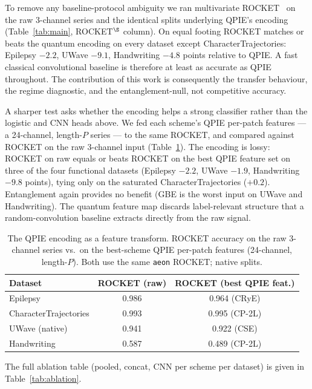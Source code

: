 \documentclass[conference,compsoc]{IEEEtran}
\begin{document}
To remove any baseline-protocol ambiguity we ran multivariate
ROCKET~\cite{dempster2020rocket} on the raw 3-channel series and the
identical splits underlying QPIE's encoding (Table~\ref{tab:main},
ROCKET$^\S$ column). On equal footing ROCKET matches or beats the quantum encoding
on every dataset except CharacterTrajectories: Epilepsy $-2.2$, UWave
$-9.1$, Handwriting $-4.8$ points relative to QPIE. A fast classical
convolutional baseline is therefore at least as accurate as QPIE
throughout. The contribution of this work is consequently the transfer
behaviour, the regime diagnostic, and the entanglement-null, not
competitive accuracy.

A sharper test asks whether the encoding helps a strong classifier
rather than the logistic and CNN heads above. We fed each scheme's
QPIE per-patch features --- a 24-channel, length-$P$ series --- to the
same ROCKET, and compared against ROCKET on the raw 3-channel input
(Table~\ref{tab:rocketqpie}). The encoding is lossy: ROCKET on raw
equals or beats ROCKET on the best QPIE feature set on three of the
four functional datasets (Epilepsy $-2.2$, UWave $-1.9$, Handwriting
$-9.8$ points), tying only on the saturated CharacterTrajectories
($+0.2$). Entanglement again provides no benefit (GBE is the worst
input on UWave and Handwriting). The quantum feature map discards
label-relevant structure that a random-convolution baseline extracts
directly from the raw signal.

\begin{table}[t]
\caption{The QPIE encoding as a feature transform. ROCKET accuracy on
the raw 3-channel series vs.\ on the best-scheme QPIE per-patch
features (24-channel, length-$P$). Both use the same \texttt{aeon}
ROCKET; native splits.}
\label{tab:rocketqpie}
\centering
\setlength{\tabcolsep}{6pt}
\begin{tabular}{lcc}
\toprule
Dataset & ROCKET (raw) & ROCKET (best QPIE feat.) \\
\midrule
Epilepsy              & 0.986 & 0.964 (CRyE)  \\
CharacterTrajectories & 0.993 & 0.995 (CP-2L) \\
UWave (native)        & 0.941 & 0.922 (CSE)   \\
Handwriting           & 0.587 & 0.489 (CP-2L) \\
\bottomrule
\end{tabular}
\end{table}

The full ablation table (pooled, concat, CNN per scheme per dataset)
is given in Table~\ref{tab:ablation}.
\end{document}
